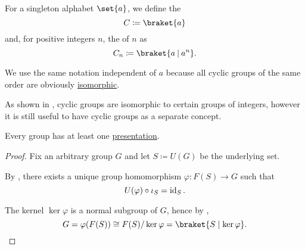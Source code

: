 \begin{definition}\label{def:cyclic_group}
  For a singleton alphabet \( \set{ a } \), we define the 
  \begin{equation*}
    C \coloneqq \braket{a}
  \end{equation*}
  and, for positive integers \( n \), the  of  \( n \) as
  \begin{equation*}
    C_n \coloneqq \braket{a \given a^n}.
  \end{equation*}

  We use the same notation independent of \( a \) because all cyclic groups of the same order are obviously \hyperref[def:group/homomorphism]{isomorphic}.

  As shown in , cyclic groups are isomorphic to certain groups of integers, however it is still useful to have cyclic groups as a separate concept.
\end{definition}

\begin{proposition}\label{thm:every_group_is_presented}
  Every group has at least one \hyperref[def:group_presentation]{presentation}.
\end{proposition}
\begin{proof}
  Fix an arbitrary group \( G \) and let \( S \coloneqq U(G) \) be the underlying set.

  By , there exists a unique group homomorphism \( \varphi: F(S) \to G \) such that
  \begin{equation*}
    U(\varphi) \bincirc \iota_S = \id_S.
  \end{equation*}

  The kernel \( \ker \varphi \) is a normal subgroup of \( G \), hence by ,
  \begin{equation*}
    G = \varphi(F(S)) \cong F(S) / \ker \varphi = \braket{ S \mid \ker \varphi }.
  \end{equation*}
\end{proof}

